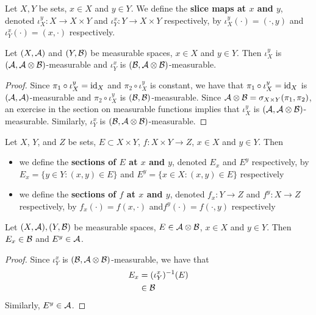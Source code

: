 \documentclass{book}
\begin{document}
	\begin{defn} 
		Let $X, Y$ be sets, $x \in X$ and $y \in Y$. We define the \textbf{slice maps at $x$ and $y$}, denoted $\iota^y_X: X \rightarrow X \times Y$ and $\iota^x_Y: Y \rightarrow X \times Y$ respectively, by $\iota^y_X(\cdot) = (\cdot, y)$ and $\iota^x_Y(\cdot) = (x, \cdot)$ respectively. 
	\end{defn}
	
	\begin{ex} 
		Let $(X, \mathcal{A} )$ and $(Y, \mathcal{B})$ be measurable spaces, $x \in X$ and $y \in Y$. Then $\iota^y_X$ is $(\mathcal{A}, \mathcal{A} \otimes \mathcal{B})$-measurable and $\iota^x_Y$  is $(\mathcal{B}, \mathcal{A} \otimes \mathcal{B})$-measurable.
	\end{ex}
	
	\begin{proof}
		Since $\pi_1 \circ \iota^y_X = \operatorname{id}_{X}$ and $\pi_2 \circ \iota^y_X$ is constant, we have that $\pi_1 \circ \iota^y_X = \operatorname{id}_{X}$ is $(\mathcal{A}, \mathcal{A})$-measurable and $\pi_2 \circ \iota^y_X$ is $(\mathcal{B}, \mathcal{B})$-measurable. Since $\mathcal{A} \otimes \mathcal{B} = \sigma_{X \times Y}(\pi_1, \pi_2)$, an exercise in the section on measurable functions implies that $\iota^y_X$ is $(\mathcal{A}, \mathcal{A} \otimes \mathcal{B})$-measurable. Similarly, $\iota^x_Y$ is $(\mathcal{B}, \mathcal{A} \otimes \mathcal{B})$-measurable.
	\end{proof}
	
	\begin{defn}  
		Let $X$, $Y$, and $Z$ be sets, $E \subset X \times Y$, $f :X \times Y \rightarrow Z$, $x \in X$ and $y \in Y$. Then
		\begin{itemize}
			\item we define the \textbf{sections of $E$ at $x$ and $y$}, denoted $E_x$ and $E^y$ respectively, by $E_x = \{y \in Y: (x,y) \in E\}$ and $E^y = \{x \in X: (x,y) \in E\}$ respectively
			\item we define the \textbf{sections of $f$ at $x$ and $y$}, denoted $f_x:Y \rightarrow Z$ and $f^y:X \rightarrow Z$ respectively, by $f_x(\cdot) = f(x,\cdot)$ and$f^y(\cdot) = f(\cdot,y)$  respectively 
		\end{itemize}
	\end{defn}

	\begin{ex} 
		Let $(X,\mathcal{A}), (Y, \mathcal{B})$ be measurable spaces, $E \in \mathcal{A} \otimes \mathcal{B}$, $x \in X$ and $y \in Y$. Then $E_x \in \mathcal{B}$ and $E^y \in \mathcal{A}$.  
	\end{ex}
	
	\begin{proof}
		Since $\iota^x_Y$ is $(\mathcal{B}, \mathcal{A} \otimes \mathcal{B})$-measurable, we have that
		\begin{align*}
			E_x 
			& = (\iota^x_Y)^{-1}(E) \\
			& \in \mathcal{B} 
		\end{align*}
		Similarly, $E^y \in \mathcal{A}$. 
	\end{proof}
	
\end{document}
